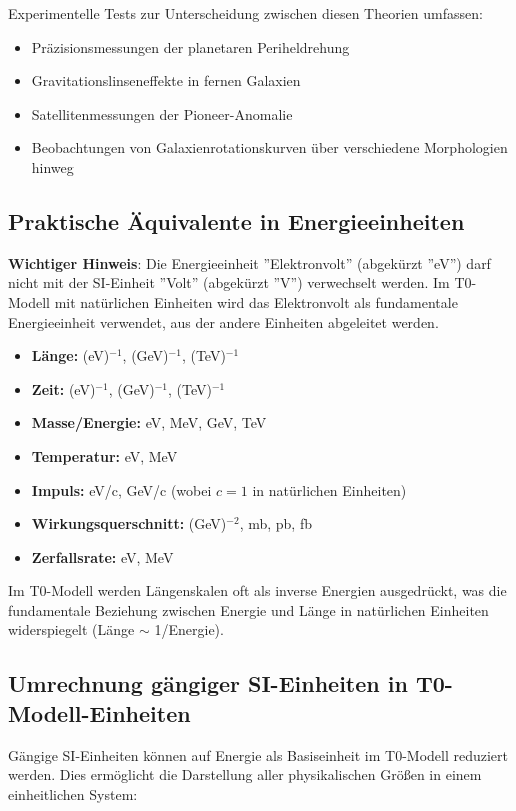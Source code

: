\documentclass[12pt,a4paper]{article}
\begin{document}
Experimentelle Tests zur Unterscheidung zwischen diesen Theorien umfassen:
\begin{itemize}
	\item Präzisionsmessungen der planetaren Periheldrehung
	\item Gravitationslinseneffekte in fernen Galaxien
	\item Satellitenmessungen der Pioneer-Anomalie
	\item Beobachtungen von Galaxienrotationskurven über verschiedene Morphologien hinweg
\end{itemize}

\subsection*{Praktische Äquivalente in Energieeinheiten}

\textbf{Wichtiger Hinweis}: Die Energieeinheit ''Elektronvolt'' (abgekürzt ''eV'') darf nicht mit der SI-Einheit ''Volt'' (abgekürzt ''V'') verwechselt werden. Im T0-Modell mit natürlichen Einheiten wird das Elektronvolt als fundamentale Energieeinheit verwendet, aus der andere Einheiten abgeleitet werden.

\begin{itemize}
	\item \textbf{Länge:} (eV)$^{-1}$, (GeV)$^{-1}$, (TeV)$^{-1}$
	\item \textbf{Zeit:} (eV)$^{-1}$, (GeV)$^{-1}$, (TeV)$^{-1}$
	\item \textbf{Masse/Energie:} eV, MeV, GeV, TeV
	\item \textbf{Temperatur:} eV, MeV
	\item \textbf{Impuls:} eV/c, GeV/c (wobei $c=1$ in natürlichen Einheiten)
	\item \textbf{Wirkungsquerschnitt:} (GeV)$^{-2}$, mb, pb, fb
	\item \textbf{Zerfallsrate:} eV, MeV
\end{itemize}

Im T0-Modell werden Längenskalen oft als inverse Energien ausgedrückt, was die fundamentale Beziehung zwischen Energie und Länge in natürlichen Einheiten widerspiegelt (Länge $\sim$ 1/Energie).

\subsection*{Umrechnung gängiger SI-Einheiten in T0-Modell-Einheiten}

Gängige SI-Einheiten können auf Energie als Basiseinheit im T0-Modell reduziert werden. Dies ermöglicht die Darstellung aller physikalischen Größen in einem einheitlichen System:
\end{document}
